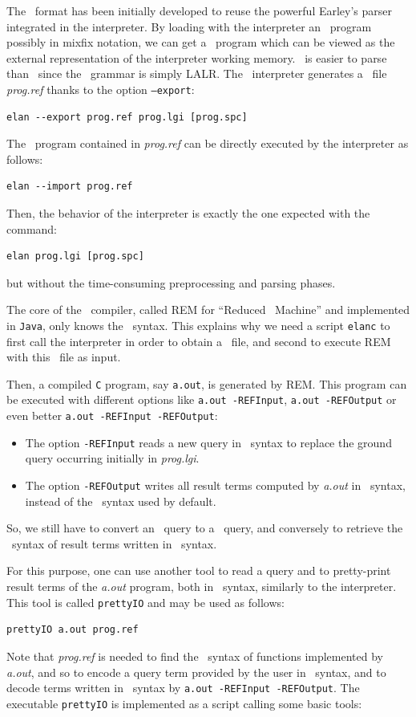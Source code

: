 The \REF\ format has been initially developed to reuse the powerful
Earley's parser integrated in the interpreter. By loading with the
interpreter an \elan\ program possibly in mixfix notation, we can get a
\REF\ program which can be viewed as the external representation of
the interpreter working memory. \REF\ is easier to parse than \elan\
since the \REF\ grammar is simply LALR.  
The \elan\ interpreter generates a \REF\ file
\textit{prog.ref} thanks to the option \texttt{--export}:
\begin{verbatim}
elan --export prog.ref prog.lgi [prog.spc]
\end{verbatim}
The \REF\ program contained in \textit{prog.ref} can be directly
executed by the interpreter as follows:
\begin{verbatim}
elan --import prog.ref
\end{verbatim}
Then, the behavior of the interpreter is exactly the one expected
with the command:
\begin{verbatim}
elan prog.lgi [prog.spc]
\end{verbatim}
but without the time-consuming preprocessing and parsing phases.

The core of the \elan\ compiler, called REM for ``Reduced \elan\ Machine'' and
implemented in \texttt{Java}, only knows the \REF\ syntax. This
explains why we need a script \texttt{elanc} to first call the
interpreter in order to obtain a \REF\ file, and second to execute REM
with this \REF\ file as input. 

Then, a compiled \texttt{C} program, 
say \texttt{a.out}, is generated by REM. This program can be executed
with different options like \texttt{a.out -REFInput}, \texttt{a.out -REFOutput}
or even better \texttt{a.out -REFInput -REFOutput}:
\begin{itemize}
\item The option \texttt{-REFInput} reads a new query in \REF\ syntax to replace
the ground query occurring initially in \textit{prog.lgi}.
\item The option \texttt{-REFOutput} writes all result terms computed by
\textit{a.out} in \REF\ syntax, instead of the \elan\ syntax used by
default. 
\end{itemize}

So, we still have to convert an \elan\ 
query to a \REF\ query, and conversely to retrieve the \elan\ syntax
of result terms written in \REF\ syntax. 

For this purpose, one can use another
tool to read a query and to pretty-print result terms of the \textit{a.out}
program, both in \elan\ syntax, similarly to the interpreter.
This tool is called \texttt{prettyIO} and may be used as follows:
\begin{verbatim}
prettyIO a.out prog.ref
\end{verbatim}
Note that \textit{prog.ref} is needed to find the \elan\ syntax of
functions implemented by \textit{a.out}, and so to encode a query
term provided by the user in \elan\ syntax, and to decode terms
written in \REF\ syntax by \texttt{a.out -REFInput -REFOutput}. 
The executable \texttt{prettyIO} is implemented as a script calling
some basic tools:  

